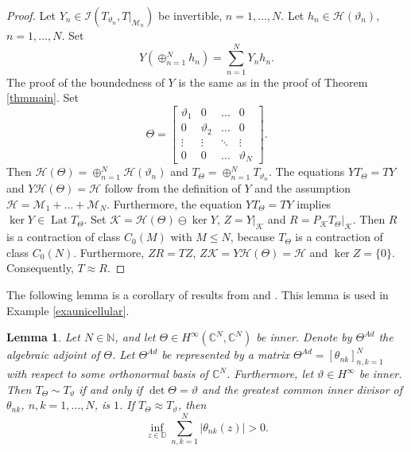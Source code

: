 \documentclass[a4paper,oneside,11pt]{amsart}
\numberwithin{equation}{section}
\theoremstyle{plain}
\newtheorem{lemma}[theorem]{Lemma}
\theoremstyle{definition}
\begin{document}
\begin{proof} 
 Let 
$Y_n\in\mathcal I(T_{\vartheta_n},T|_{\mathcal M_n})$  be invertible,  $n=1,\ldots, N$. 
Let $h_n\in\mathcal H(\vartheta_n)$,  $n=1,\ldots, N$. 
Set \begin{equation*}Y(\oplus_{n=1}^N h_n)=\sum_{n=1}^NY_n h_n. \end{equation*}
The proof of the boundedness of $Y$ is the same as in the proof of Theorem \ref{thmmain}. 
Set \begin{equation*} \Theta=\left[\begin{matrix}\vartheta_1 & 0 & \ldots & 0 \\
0 & \vartheta_2 & \ldots & 0 \\ 
 \vdots & \vdots & \ddots & \vdots \\
0 & 0 & \ldots & \vartheta_N \end{matrix}\right].\end{equation*} 
Then $\mathcal H(\Theta)=\oplus_{n=1}^N  \mathcal H(\vartheta_n)$ and $T_\Theta=\oplus_{n=1}^N  T_{\vartheta_n}$. 
 The equations $Y  T_\Theta=TY$ and $Y \mathcal H(\Theta)=\mathcal H$ follow from the definition 
of $Y$ and the  assumption $\mathcal H=\mathcal M_1+\ldots+\mathcal M_N$. Furthermore, 
the equation $YT_\Theta=TY$ 
implies $\ker Y\in\operatorname{Lat}T_\Theta$. Set $\mathcal K= \mathcal H(\Theta)\ominus\ker Y$, 
$Z=Y|_{\mathcal K}$ and $R=P_{\mathcal K}T_\Theta|_{\mathcal K}$. Then $R$ is a contraction of class $C_0(M)$ 
with $M\leq N$, because $T_\Theta$ is a contraction of class $C_0(N)$. Furthermore, 
 $ZR=TZ$, $Z\mathcal K=Y \mathcal H(\Theta)=\mathcal H$ 
and $\ker Z=\{0\}$. Consequently, $T\approx R$. 
\end{proof} 


The following lemma is a corollary of results from \cite{sznfbk} and \cite{berc}. This lemma is used in Example  \ref{exaunicellular}. 

\begin{lemma} \label{lemexa} Let $N\in\mathbb N$, and let $\Theta\in H^\infty(\mathbb C^N,\mathbb C^N)$ be inner. 
Denote by $\Theta^{Ad}$ the algebraic adjoint of $\Theta$. Let $\Theta^{Ad}$ be 
represented by a matrix $\Theta^{Ad}=[\theta_{nk}]_{n,k=1}^N$ with respect to some orthonormal basis of 
 $\mathbb C^N$. 
Furthermore, let $\vartheta\in H^\infty$ be inner. Then $T_\Theta\sim T_\vartheta$ if and only if $\det\Theta=\vartheta$ and 
the greatest common inner divisor of  $\theta_{nk}$, $n,k=1,\ldots,N$, is $1$. If $T_\Theta\approx T_\vartheta$, then  
\begin{equation*} \inf_{z\in\mathbb D}\sum_{n,k=1}^N|\theta_{nk}(z)|>0.  
\end{equation*}
\end{lemma}
 
\end{document}
